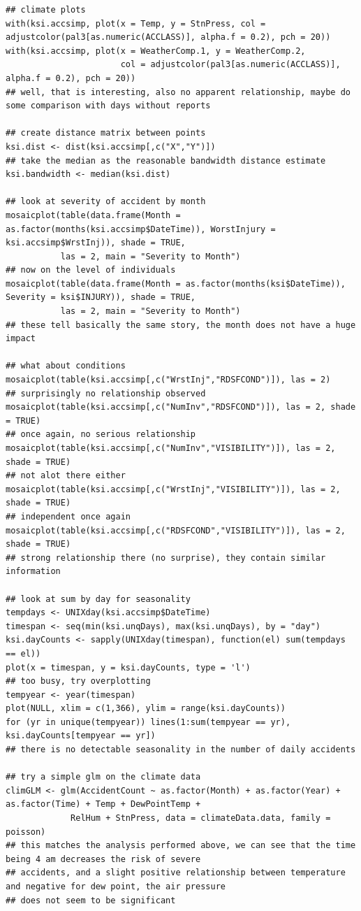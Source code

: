 \documentclass{article}
\begin{document}
\begin{lstlisting}
## climate plots
with(ksi.accsimp, plot(x = Temp, y = StnPress, col = adjustcolor(pal3[as.numeric(ACCLASS)], alpha.f = 0.2), pch = 20))
with(ksi.accsimp, plot(x = WeatherComp.1, y = WeatherComp.2,
                       col = adjustcolor(pal3[as.numeric(ACCLASS)], alpha.f = 0.2), pch = 20))
## well, that is interesting, also no apparent relationship, maybe do some comparison with days without reports

## create distance matrix between points
ksi.dist <- dist(ksi.accsimp[,c("X","Y")])
## take the median as the reasonable bandwidth distance estimate
ksi.bandwidth <- median(ksi.dist)

## look at severity of accident by month
mosaicplot(table(data.frame(Month = as.factor(months(ksi.accsimp$DateTime)), WorstInjury = ksi.accsimp$WrstInj)), shade = TRUE,
           las = 2, main = "Severity to Month")
## now on the level of individuals
mosaicplot(table(data.frame(Month = as.factor(months(ksi$DateTime)), Severity = ksi$INJURY)), shade = TRUE,
           las = 2, main = "Severity to Month")
## these tell basically the same story, the month does not have a huge impact

## what about conditions
mosaicplot(table(ksi.accsimp[,c("WrstInj","RDSFCOND")]), las = 2)
## surprisingly no relationship observed
mosaicplot(table(ksi.accsimp[,c("NumInv","RDSFCOND")]), las = 2, shade = TRUE)
## once again, no serious relationship
mosaicplot(table(ksi.accsimp[,c("NumInv","VISIBILITY")]), las = 2, shade = TRUE)
## not alot there either
mosaicplot(table(ksi.accsimp[,c("WrstInj","VISIBILITY")]), las = 2, shade = TRUE)
## independent once again
mosaicplot(table(ksi.accsimp[,c("RDSFCOND","VISIBILITY")]), las = 2, shade = TRUE)
## strong relationship there (no surprise), they contain similar information

## look at sum by day for seasonality
tempdays <- UNIXday(ksi.accsimp$DateTime)
timespan <- seq(min(ksi.unqDays), max(ksi.unqDays), by = "day")
ksi.dayCounts <- sapply(UNIXday(timespan), function(el) sum(tempdays == el))
plot(x = timespan, y = ksi.dayCounts, type = 'l')
## too busy, try overplotting
tempyear <- year(timespan)
plot(NULL, xlim = c(1,366), ylim = range(ksi.dayCounts))
for (yr in unique(tempyear)) lines(1:sum(tempyear == yr), ksi.dayCounts[tempyear == yr])
## there is no detectable seasonality in the number of daily accidents

## try a simple glm on the climate data
climGLM <- glm(AccidentCount ~ as.factor(Month) + as.factor(Year) + as.factor(Time) + Temp + DewPointTemp +
             RelHum + StnPress, data = climateData.data, family = poisson)
## this matches the analysis performed above, we can see that the time being 4 am decreases the risk of severe
## accidents, and a slight positive relationship between temperature and negative for dew point, the air pressure
## does not seem to be significant


\end{lstlisting}
\end{document}

